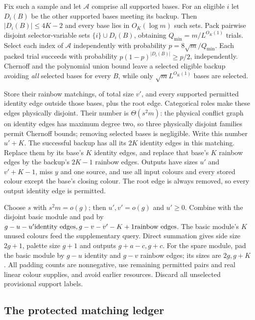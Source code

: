 Fix such a sample and let $\mathcal{A}$ comprise all supported bases. For an eligible $i$ let $D_i(B)$ be the other supported bases meeting its backup.  Then $|D_i(B)|\le4K-2$ and every base lies in $O_K(\log{}m)$ such sets.  Pack pairwise disjoint selector-variable sets $\{i\}\cup{}D_i(B)$, obtaining $Q_{\min}=m/L^{O_K(1)}$ trials.  Select each index of $\mathcal{A}$ independently with probability $p=8\sqrt{m}/Q_{\min}$.  Each packed trial succeeds with probability $p(1-p)^{|D_i(B)|}\ge{}p/2$, independently.  Chernoff and the polynomial union bound leave a selected eligible backup avoiding
\emph{all} selected bases for every $B$, while only $\sqrt{m}L^{O_K(1)}$ bases are selected.

Store their rainbow matchings, of total size $v'$, and every supported permitted identity edge outside those bases, plus the root edge.
Categorical roles make these edges physically disjoint.  Their number
is $\Theta(s^2m)$: the physical conflict graph on identity edges has maximum degree two, so three physically disjoint families permit
Chernoff bounds; removing selected bases is negligible.  Write this
number $u'+K$.  The successful backup has all its $2K$ identity edges in this matching.  Replace them by its base's $K$ identity edges, and replace that base's $K$ rainbow edges by the backup's $2K-1$ rainbow edges.  Outputs have sizes $u'$ and $v'+K-1$, miss $y$ and one source, and use all input colours and every stored colour except the base's closing colour.  The root edge is always
removed, so every output identity edge is permitted.

Choose $s$ with $s^2m=o(g)$; then $u',v'=o(g)$ and $u'\ge0$. Combine with the disjoint basic module and pad by $g-u-u'\hbox{identity edges},g-v-v'-K+1\hbox{rainbow edges}$. The basic module's $K$ unused colours feed the supplementary query. Direct summation gives side size $2g+1$, palette size $g+1$ and outputs $g+a-c,g+c$.  For the spare module, pad the basic module by $g-u$ identity and $g-v$ rainbow edges; its sizes are $2g,g+K$. All padding counts are nonnegative, use remaining permitted pairs
and real linear colour supplies, and avoid earlier resources.
Discard all unselected provisional support labels.

\subsection{The protected matching ledger}
\label{sg:sec:protected}\label{sg:lem:entropyinput}
\label{thm:matchinginterface}

